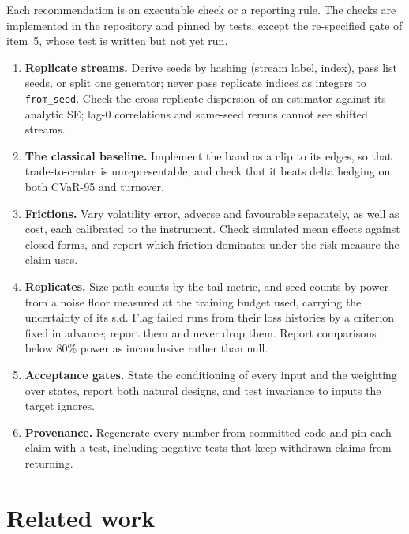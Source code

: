 \documentclass{article}
\newcommand{\cvar}{CVaR-95}
\newcommand{\fromseed}{\texttt{from\_seed}}
\begin{document}
Each recommendation is an executable check or a reporting rule. The checks are implemented in the
repository and pinned by tests, except the re-specified gate of item~5, whose test is written but
not yet run.
\begin{enumerate}
\item \textbf{Replicate streams.} Derive seeds by hashing (stream label, index), pass list seeds, or
  split one generator; never pass replicate indices as integers to \fromseed{}. Check the
  cross-replicate dispersion of an estimator against its analytic SE; lag-0 correlations and
  same-seed reruns cannot see shifted streams.
\item \textbf{The classical baseline.} Implement the band as a clip to its edges, so that trade-to-centre
  is unrepresentable, and check that it beats delta hedging on both \cvar{} and turnover.
\item \textbf{Frictions.} Vary volatility error, adverse and favourable separately, as well as cost,
  each calibrated to the instrument. Check simulated mean effects against closed forms, and report
  which friction dominates under the risk measure the claim uses.
\item \textbf{Replicates.} Size path counts by the tail metric, and seed counts by power from a
  noise floor measured at the training budget used, carrying the uncertainty of its s.d. Flag
  failed runs from their loss histories by a criterion fixed in advance; report them and never
  drop them. Report comparisons below 80\% power as inconclusive rather than null.
\item \textbf{Acceptance gates.} State the conditioning of every input and the weighting over states,
  report both natural designs, and test invariance to inputs the target ignores.
\item \textbf{Provenance.} Regenerate every number from committed code and pin each claim with a
  test, including negative tests that keep withdrawn claims from returning.
\end{enumerate}

\section{Related work}\label{sec:related}
\end{document}
